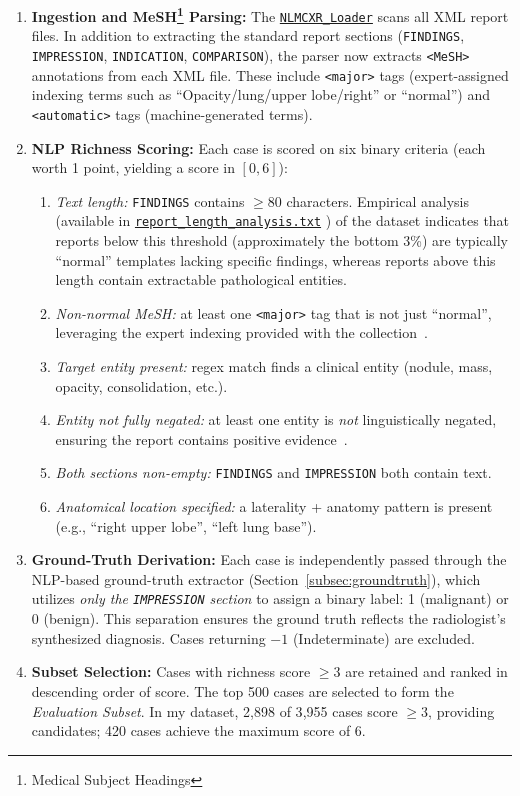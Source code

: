 \documentclass[12pt]{article}
\begin{document}
\begin{enumerate}
    \item \textbf{Ingestion and MeSH\footnote{Medical Subject Headings} Parsing:} The \href{https://github.com/sepehrkdi/lung_nodule_mas/blob/main/data/nlmcxr_loader.py}{\texttt{NLMCXR\_Loader}} scans all XML report files. In addition to extracting the standard report sections (\texttt{FINDINGS}, \texttt{IMPRESSION}, \texttt{INDICATION}, \texttt{COMPARISON}), the parser now extracts \texttt{<MeSH>} annotations from each XML file. These include \texttt{<major>} tags (expert-assigned indexing terms such as ``Opacity/lung/upper lobe/right'' or ``normal'') and \texttt{<automatic>} tags (machine-generated terms).
    \item \textbf{NLP Richness Scoring:} Each case is scored on six binary criteria (each worth 1 point, yielding a score in $[0, 6]$):
    \begin{enumerate}
        \item \emph{Text length:} \texttt{FINDINGS} contains $\geq 80$ characters. Empirical analysis (available in \href{https://github.com/sepehrkdi/lung_nodule_mas/blob/main/report/report_length_analysis.txt}{\texttt{report\_length\_analysis.txt}} ) of the dataset indicates that reports below this threshold (approximately the bottom 3\%) are typically ``normal'' templates lacking specific findings, whereas reports above this length contain extractable pathological entities.
        \item \emph{Non-normal MeSH:} at least one \texttt{<major>} tag that is not just ``normal'', leveraging the expert indexing provided with the collection~\cite{demsar2005openi}.
        \item \emph{Target entity present:} regex match finds a clinical entity (nodule, mass, opacity, consolidation, etc.).
        \item \emph{Entity not fully negated:} at least one entity is \emph{not} linguistically negated, ensuring the report contains positive evidence~\cite{chapman2001negex, peng2018negbio}.
        \item \emph{Both sections non-empty:} \texttt{FINDINGS} and \texttt{IMPRESSION} both contain text.
        \item \emph{Anatomical location specified:} a laterality + anatomy pattern is present (e.g., ``right upper lobe'', ``left lung base'').
    \end{enumerate}
    \item \textbf{Ground-Truth Derivation:} Each case is independently passed through the NLP-based ground-truth extractor (Section~\ref{subsec:groundtruth}), which utilizes \emph{only the \texttt{IMPRESSION} section} to assign a binary label: 1 (malignant) or 0 (benign). This separation ensures the ground truth reflects the radiologist's synthesized diagnosis. Cases returning $-1$ (Indeterminate) are excluded.
    \item \textbf{Subset Selection:} Cases with richness score $\geq 3$ are retained and ranked in descending order of score. The top 500 cases are selected to form the \emph{Evaluation Subset}. In my dataset, 2{,}898 of 3{,}955 cases score $\geq 3$, providing candidates; 420 cases achieve the maximum score of 6.
\end{enumerate}
\end{document}
